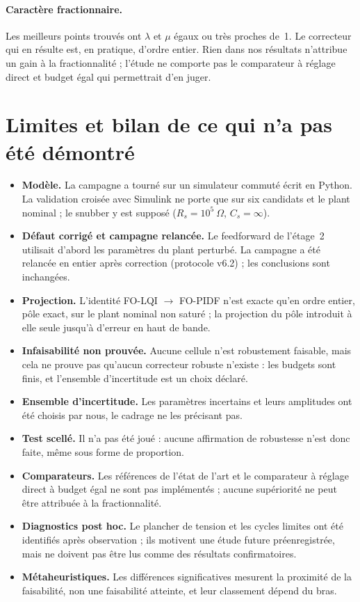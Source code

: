 \paragraph{Caractère fractionnaire.}
Les meilleurs points trouvés ont $\lambda$ et $\mu$ égaux ou très proches
de~1. Le correcteur qui en résulte est, en pratique, d'ordre entier. Rien dans
nos résultats n'attribue un gain à la fractionnalité ; l'étude ne comporte
pas le comparateur à réglage direct et budget égal qui permettrait d'en
juger.

\section{Limites et bilan de ce qui n'a pas été démontré}
\label{sec:limites}

\begin{itemize}
\item \textbf{Modèle.} La campagne a tourné sur un simulateur commuté écrit
  en Python. La validation croisée avec Simulink ne porte que sur six
  candidats et le plant nominal ; le snubber y est supposé ($R_s=10^5~\Omega$,
  $C_s=\infty$).
\item \textbf{Défaut corrigé et campagne relancée.} Le feedforward de
  l'étage~2 utilisait d'abord les paramètres du plant perturbé. La campagne a
  été relancée en entier après correction (protocole v6.2) ; les conclusions
  sont inchangées.
\item \textbf{Projection.} L'identité FO-LQI $\to$ FO-PIDF n'est exacte qu'en
  ordre entier, pôle exact, sur le plant nominal non saturé ; la projection du
  pôle introduit à elle seule jusqu'à \ChiffreErreurProjPole{} d'erreur en
  haut de bande.
\item \textbf{Infaisabilité non prouvée.} Aucune cellule n'est robustement
  faisable, mais cela ne prouve pas qu'aucun correcteur robuste n'existe :
  les budgets sont finis, et l'ensemble d'incertitude est un choix déclaré.
\item \textbf{Ensemble d'incertitude.} Les paramètres incertains et leurs
  amplitudes ont été choisis par nous, le cadrage ne les précisant pas.
\item \textbf{Test scellé.} Il n'a pas été joué : aucune affirmation de
  robustesse n'est donc faite, même sous forme de proportion.
\item \textbf{Comparateurs.} Les références de l'état de l'art et le
  comparateur à réglage direct à budget égal ne sont pas implémentés ; aucune
  supériorité ne peut être attribuée à la fractionnalité.
\item \textbf{Diagnostics post hoc.} Le plancher de tension et les cycles
  limites ont été identifiés après observation ; ils motivent une étude
  future préenregistrée, mais ne doivent pas être lus comme des résultats
  confirmatoires.
\item \textbf{Métaheuristiques.} Les différences significatives mesurent la
  proximité de la faisabilité, non une faisabilité atteinte, et leur
  classement dépend du bras.
\end{itemize}
